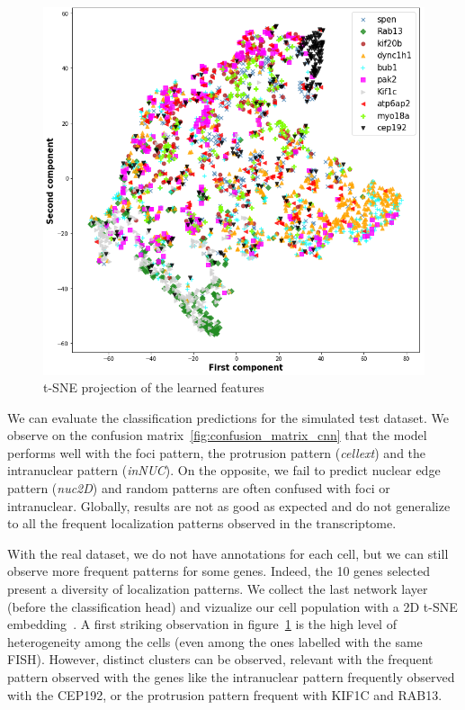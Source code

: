 \begin{figure}[h]
    \centering
    \includegraphics[width=\textwidth]{figures/appendix/tsne_cnn}
    \caption[t-SNE projection of the features learned with CNN]{t-SNE projection of the learned features}
    \label{fig:tsne_cnn}
\end{figure}

We can evaluate the classification predictions for the simulated test dataset.
We observe on the confusion matrix~\ref{fig:confusion_matrix_cnn} that the model performs well with the foci pattern, the protrusion pattern (\emph{cellext}) and the intranuclear pattern (\emph{inNUC}).
On the opposite, we fail to predict nuclear edge pattern (\emph{nuc2D}) and random patterns are often confused with foci or intranuclear.
Globally, results are not as good as expected and do not generalize to all the frequent localization patterns observed in the transcriptome.

With the real dataset, we do not have annotations for each cell, but we can still observe more frequent patterns for some genes.
Indeed, the 10 genes selected present a diversity of localization patterns.
We collect the last network layer (before the classification head) and vizualize our cell population with a 2D t-SNE embedding~\cite{vandermaaten_2008,wattenberg2016}.
A first striking observation in figure~\ref{fig:tsne_cnn} is the high level of heterogeneity among the cells (even among the ones labelled with the same \ac{FISH}).
However, distinct clusters can be observed, relevant with the frequent pattern observed with the genes like the intranuclear pattern frequently observed with the CEP192, or the protrusion pattern frequent with KIF1C and RAB13.

